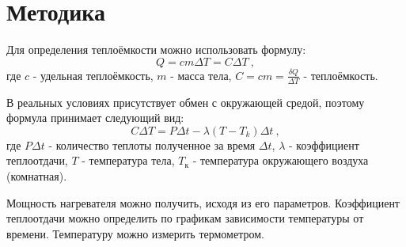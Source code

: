\chapter{Методика}
\label{ch:methods}

    Для определения теплоёмкости можно использовать формулу:
    $$Q = cm \Delta T = C \Delta T \ ,$$
    где $c$ - удельная теплоёмкость, $m$ - масса тела, $C=cm=\frac{\delta Q}{\Delta T}$ - теплоёмкость.
    
    В реальных условиях присутствует обмен с окружающей средой, поэтому формула принимает следующий вид:
    \[
    C \Delta T = P \Delta t - \lambda (T - T_k) \Delta t \ ,
    \]
    где $P \Delta t$ - количество теплоты полученное за время $\Delta t$, $\lambda$ - коэффициент теплоотдачи, $T$ - температура тела, $T_\text{к}$ - температура окружающего воздуха (комнатная). 

    Мощность нагревателя можно получить, исходя из его параметров. Коэффициент теплоотдачи можно определить по графикам зависимости температуры от времени. Температуру можно измерить термометром.